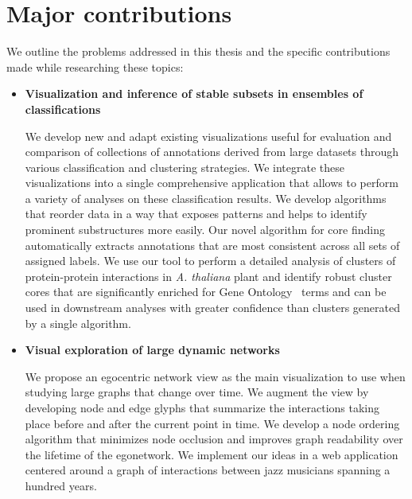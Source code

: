 


\section{Major contributions}

We outline the problems addressed in this thesis and the specific contributions made while researching these topics:

\begin{itemize}
  \item \textbf{Visualization and inference of stable subsets in ensembles of classifications}

  We develop new and adapt existing visualizations useful for evaluation and comparison of collections of annotations derived from large datasets through various classification and clustering strategies. We integrate these visualizations into a single comprehensive application that allows to perform a variety of analyses on these classification results. We develop algorithms that reorder data in a way that exposes patterns and helps to identify prominent substructures more easily. Our novel algorithm for core finding automatically extracts annotations that are most consistent across all sets of assigned labels. We use our tool to perform a detailed analysis of clusters of protein-protein interactions in \textit{A. thaliana} plant and identify robust cluster cores that are significantly enriched for Gene Ontology~\cite{GeneOntology} terms and can be used in downstream analyses with greater confidence than clusters generated by a single algorithm.


  \item \textbf{Visual exploration of large dynamic networks}

  We propose an egocentric network view as the main visualization to use when  studying large graphs that change over time. We augment the view by developing node and edge glyphs that summarize the interactions taking place before and after the current point in time. We develop a node ordering algorithm that minimizes node occlusion and improves graph readability over the lifetime of the egonetwork. We implement our ideas in a web application centered around a graph of interactions between jazz musicians spanning a hundred years.


\end{itemize}
